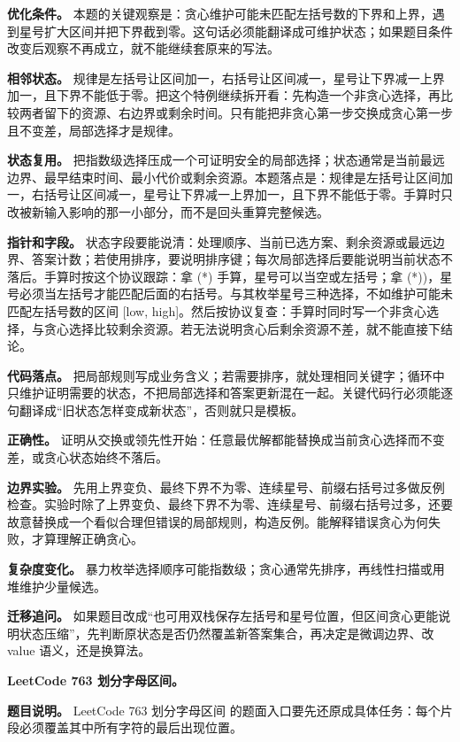 \textbf{优化条件。} 本题的关键观察是：贪心维护可能未匹配左括号数的下界和上界，遇到星号扩大区间并把下界截到零。这句话必须能翻译成可维护状态；如果题目条件改变后观察不再成立，就不能继续套原来的写法。

\textbf{相邻状态。} 规律是左括号让区间加一，右括号让区间减一，星号让下界减一上界加一，且下界不能低于零。把这个特例继续拆开看：先构造一个非贪心选择，再比较两者留下的资源、右边界或剩余时间。只有能把非贪心第一步交换成贪心第一步且不变差，局部选择才是规律。

\textbf{状态复用。} 把指数级选择压成一个可证明安全的局部选择；状态通常是当前最远边界、最早结束时间、最小代价或剩余资源。本题落点是：规律是左括号让区间加一，右括号让区间减一，星号让下界减一上界加一，且下界不能低于零。手算时只改被新输入影响的那一小部分，而不是回头重算完整候选。

\textbf{指针和字段。} 状态字段要能说清：处理顺序、当前已选方案、剩余资源或最远边界、答案计数；若使用排序，要说明排序键；每次局部选择后要能说明当前状态不落后。手算时按这个协议跟踪：拿 (*) 手算，星号可以当空或左括号；拿 (*))，星号必须当左括号才能匹配后面的右括号。与其枚举星号三种选择，不如维护可能未匹配左括号数的区间 [low, high]。然后按协议复查：手算时同时写一个非贪心选择，与贪心选择比较剩余资源。若无法说明贪心后剩余资源不差，就不能直接下结论。

\textbf{代码落点。} 把局部规则写成业务含义；若需要排序，就处理相同关键字；循环中只维护证明需要的状态，不把局部选择和答案更新混在一起。关键代码行必须能逐句翻译成“旧状态怎样变成新状态”，否则就只是模板。

\textbf{正确性。} 证明从交换或领先性开始：任意最优解都能替换成当前贪心选择而不变差，或贪心状态始终不落后。

\textbf{边界实验。} 先用上界变负、最终下界不为零、连续星号、前缀右括号过多做反例检查。实验时除了上界变负、最终下界不为零、连续星号、前缀右括号过多，还要故意替换成一个看似合理但错误的局部规则，构造反例。能解释错误贪心为何失败，才算理解正确贪心。

\textbf{复杂度变化。} 暴力枚举选择顺序可能指数级；贪心通常先排序，再线性扫描或用堆维护少量候选。

\textbf{迁移追问。} 如果题目改成“也可用双栈保存左括号和星号位置，但区间贪心更能说明状态压缩”，先判断原状态是否仍然覆盖新答案集合，再决定是微调边界、改 value 语义，还是换算法。

\noindent\textbf{LeetCode 763 划分字母区间。}

\textbf{题目说明。} LeetCode 763 划分字母区间 的题面入口要先还原成具体任务：每个片段必须覆盖其中所有字符的最后出现位置。

